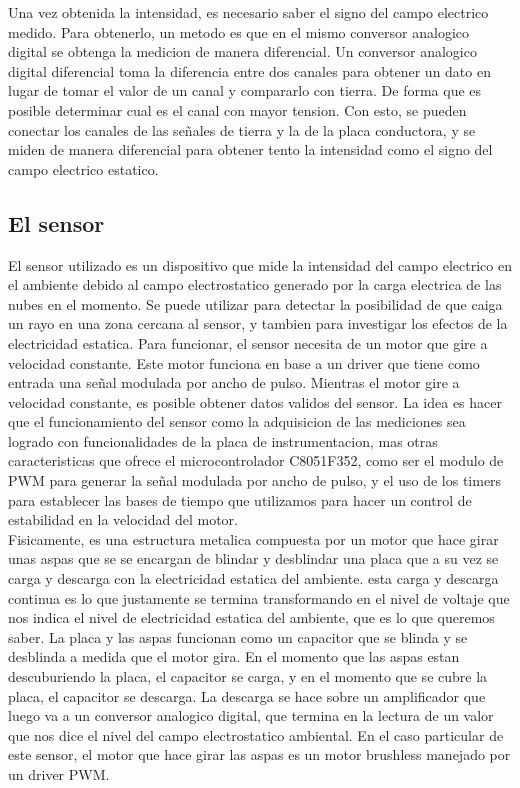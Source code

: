 Una vez obtenida la intensidad, es necesario saber el signo del campo electrico medido. Para obtenerlo, un metodo es que en el mismo conversor analogico digital se obtenga la medicion de manera diferencial. Un conversor analogico digital diferencial toma la diferencia entre dos canales para obtener un dato en lugar de tomar el valor de un canal y compararlo con tierra. De forma que es posible determinar cual es el canal con mayor tension. Con esto, se pueden conectar los canales de las señales de tierra y la de la placa conductora, y se miden de manera diferencial para obtener tento la intensidad como el signo del campo electrico estatico.
\cite{sensorcampo}

\subsection{El sensor} %
\label{sub:el_sensor}

El sensor utilizado es un dispositivo que mide la intensidad del campo electrico en el ambiente debido al campo electrostatico generado por la carga electrica de las nubes en el momento. Se puede utilizar para detectar la posibilidad de que caiga un rayo en una zona cercana al sensor, y tambien para investigar los efectos de la electricidad estatica. Para funcionar, el sensor necesita de un motor que gire a velocidad constante. Este motor funciona en base a un driver que tiene como entrada una señal modulada por ancho de pulso.
Mientras el motor gire a velocidad constante, es posible obtener datos validos del sensor. La idea es hacer que el funcionamiento del sensor como la adquisicion de las mediciones sea logrado con funcionalidades de la placa de instrumentacion, mas otras caracteristicas que ofrece el microcontrolador C8051F352, como ser el modulo de PWM para generar la señal modulada por ancho de pulso, y el uso de los timers para establecer las bases de tiempo que utilizamos para hacer un control de estabilidad en la velocidad del motor. \\

Fisicamente, es una estructura metalica compuesta por un motor que hace girar unas aspas que se se encargan de blindar y desblindar una placa que a su vez se carga y descarga con la electricidad estatica del ambiente. esta carga y descarga continua es lo que justamente se termina transformando en el nivel de voltaje que nos indica el nivel de electricidad estatica del ambiente, que es lo que queremos saber.
La placa y las aspas funcionan como un capacitor que se blinda y se des\-blinda a medida que el motor gira. En el momento que las aspas estan descuburiendo la placa, el capacitor se carga, y en el momento que se cubre la placa, el capacitor se descarga. La descarga se hace sobre un amplificador que luego va a un conversor analogico digital, que termina en la lectura de un valor que nos dice el nivel del campo electrostatico ambiental. En el caso particular de este sensor, el motor que hace girar las aspas es un motor brushless manejado por un driver PWM.

